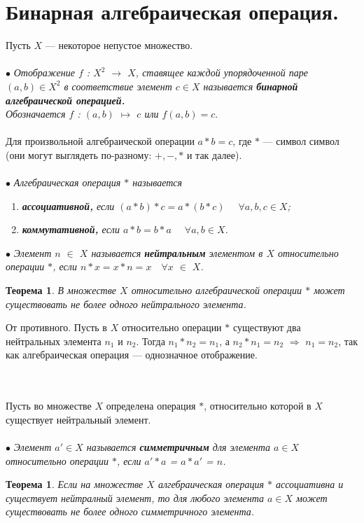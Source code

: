 \section{Бинарная алгебраическая операция.}
Пусть $X$ --- некоторое непустое множество.\\\\
$\bullet$ \textit{Отображение $f$ : $X^2$ $\rightarrow$ $X$, ставящее каждой упорядоченной паре $(a,b) \in X^2$ в соответствие элемент $c\in X$ называется \textbf{бинарной алгебраической операцией.} \\ Обозначается $f$ : $(a,b)$ $\mapsto$ $c$ или $f(a,b) = c$}.\\\\
Для произвольной алгебраической операции $a * b = c$, где $*$ --- символ символ (они могут выглядеть по-разному: $+, -, *$ и так далее).\\\\
$\bullet$ \textit{Алгебраическая операция $*$ называется} \begin{enumerate}
	\item \textit{\textbf{ассоциативной,} если $(a*b)*c = a*(b*c)$ $\quad\forall a, b, c \in X$;}
	\item \textit{\textbf{коммутативной,} если $a*b = b*a$ $\quad\forall a, b \in X$.}
\end{enumerate}
$\bullet$ \textit{Элемент $n$ $\in$ $X$ называется \textbf{нейтральным} элементом в $X$ относительно операции $*$, если $n * x = x * n = x\quad\forall x$ $\in$ $X$.}
\newtheorem*{t6_3}{Теорема}\begin{t6_3} В множестве $X$ относительно алгебраической операции $*$ может существовать не более одного нейтрального элемента. \end{t6_3} 
\begin{Proof} От противного. Пусть в $X$ относительно операции $*$ существуют два нейтральных элемента $n_1$ и $n_2$. Тогда $n_1 * n_2 = n_1$, а $n_2 * n_1 = n_2$ $\Rightarrow$ $n_1 = n_2$, так как алгебраическая операция --- однозначное отображение. \end{Proof} \\\\
Пусть во множестве $X$ определена операция $*$, относительно которой в $X$ существует нейтральный элемент.\\\\
$\bullet$ \textit{Элемент $a'\in X$ называется \textbf{симметричным} для элемента $a\in X$ относительно операции $*$, если $a' * a$ = $a * a'$ = $n$.}
\newtheorem*{t6_3_2}{Теорема}\begin{t6_3_2} Если на множестве $X$ алгебраическая операция $*$ ассоциативна и существует нейтралный элемент, то для любого элемента $a\in X$ может существовать не более одного симметричного элемента.  \end{t6_3_2} 
